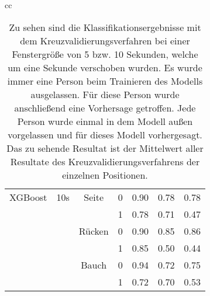 \begin{table}
\begin{tabular}{cc}
\begin{minipage}{1\linewidth}
\begin{center}
\begin{tabular}{ | l | c | c | c | c | c | r | }
            \hline
            XGBoost & 10s & Seite & 0 & 0.90 & 0.78 & 0.78 \\
                    &     &       & 1 & 0.78 & 0.71 & 0.47 \\ \hline
                    &     & Rücken& 0 & 0.90 & 0.85 & 0.86 \\
                    &     &       & 1 & 0.85 & 0.50 & 0.44 \\ \hline
                    &     & Bauch & 0 & 0.94 & 0.72 & 0.75 \\
                    &     &       & 1 & 0.72 & 0.70 & 0.53 \\ \hline
          \end{tabular}
          \smallskip
      \end{center}
  \end{minipage} 
    
  \end{tabular}
  \caption{Zu sehen sind die Klassifikationsergebnisse mit dem Kreuzvalidierungsverfahren bei einer Fenstergröße von 5 bzw. 10 Sekunden, welche um eine Sekunde verschoben wurden. Es wurde immer eine Person beim Trainieren des Modells ausgelassen. Für diese Person wurde anschließend eine Vorhersage getroffen. Jede Person wurde einmal in dem Modell außen vorgelassen und für dieses Modell vorhergesagt. Das zu sehende Resultat ist der Mittelwert aller Resultate des Kreuzvalidierungsverfahrens der einzelnen Positionen.}
  \label{evaluation:loso_classification_results}  
\end{table}